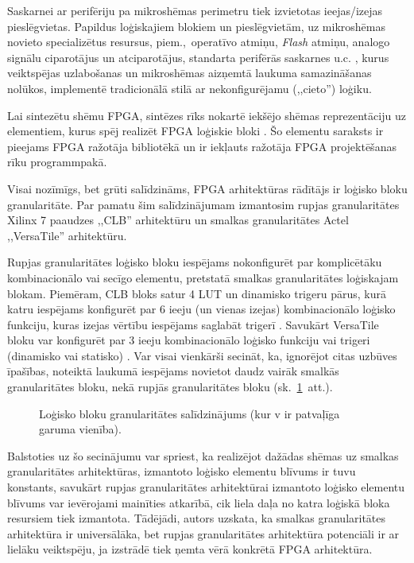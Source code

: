 	Saskarnei ar perifēriju pa mikroshēmas perimetru tiek izvietotas
	ieejas/izejas pieslēgvietas. Papildus loģiskajiem blokiem un
	pieslēgvietām, uz mikroshēmas novieto specializētus resursus, piem.,~operatīvo
	atmiņu, \textit{Flash} atmiņu, analogo signālu ciparotājus un 
	atciparotājus, standarta perifērās saskarnes u.c.
	\cite{SmartFusionFabric}\cite{Xilinx7}, kurus veiktspējas uzlabošanas 
	un mikroshēmas aizņemtā laukuma samazināšanas nolūkos, implementē
	tradicionālā stilā ar nekonfigurējamu (,,cieto'') loģiku.
	
	Lai sintezētu shēmu FPGA, sintēzes rīks nokartē iekšējo shēmas
	reprezentāciju uz elementiem, kurus spēj realizēt FPGA loģiskie bloki
	\cite{HDL}\cite{Perry-VHDL}.
	Šo elementu saraksts ir pieejams FPGA ražotāja bibliotēkā un ir
	iekļauts ražotāja FPGA projektēšanas rīku programmpakā.
	
	Visai nozīmīgs, bet grūti salīdzināms, FPGA arhitektūras rādītājs ir 
	loģisko bloku granularitāte. Par pamatu šim salīdzinājumam izmantosim
	rupjas granularitātes\linebreak
	Xilinx 7 paaudzes ,,CLB'' arhitektūru\cite{Xilinx7}
	un smalkas granularitātes Actel ,,VersaTile''
	arhitektūru\cite{SmartFusionFabric}.
	
	Rupjas granularitātes loģisko bloku iespējams nokonfigurēt par
	komplicētāku kombinacionālo vai secīgo elementu, pretstatā smalkas
	granularitātes loģiskajam blokam. Piemēram, CLB bloks satur 4 LUT un
	dinamisko trigeru pārus, kurā katru iespējams
	konfigurēt par 6 ieeju (un vienas izejas) kombinacionālo loģisko
	funkciju, kuras izejas vērtību iespējams saglabāt trigerī
	\cite[6.~lpp.]{Xilinx7}.
	Savukārt VersaTile bloku var konfigurēt par 3 ieeju kombinacionālo
	loģisko funkciju vai trigeri (dinamisko vai statisko)
	\cite[3.~lpp.]{SmartFusionFabric}.
	Var visai vienkārši secināt, ka, ignorējot citas uzbūves īpašības, 
	noteiktā laukumā iespējams novietot daudz vairāk smalkās granularitātes
	bloku, nekā rupjās granularitātes bloku (sk.~\ref{fig:tiles}~att.).
	\begin{figure}[hb]
		\centering
		
		\caption[Loģisko bloku granularitātes salīdzinājums.]%
			{Loģisko bloku granularitātes salīdzinājums 
				(kur v ir patvaļīga garuma vienība).}
		\label{fig:tiles}
	\end{figure}
	
	Balstoties uz šo secinājumu var spriest, ka realizējot dažādas shēmas
	uz smalkas granularitātes arhitektūras,
	izmantoto loģisko elementu blīvums ir tuvu konstants, savukārt rupjas
	granularitātes arhitektūrai izmantoto loģisko elementu blīvums var
	ievērojami mainīties atkarībā, cik liela daļa no katra loģiskā bloka
	resursiem tiek izmantota. Tādējādi, autors uzskata, ka smalkas
	granularitātes arhitektūra ir universālāka, bet rupjas granularitātes 
	arhitektūra potenciāli ir ar lielāku veiktspēju, ja izstrādē tiek ņemta
	vērā konkrētā FPGA arhitektūra.
	
